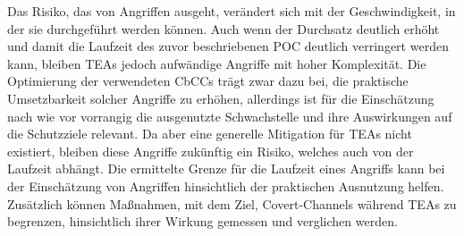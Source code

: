 Das Risiko, das von Angriffen ausgeht, verändert sich mit der
Geschwindigkeit, in der sie durchgeführt werden können. Auch
wenn der Durchsatz deutlich erhöht und damit die Laufzeit des
zuvor beschriebenen \ac{POC} deutlich verringert werden kann,
bleiben \acp{TEA} jedoch aufwändige Angriffe mit hoher Komplexität.
Die Optimierung der verwendeten \acp{CbCC} trägt zwar dazu bei,
die praktische Umsetzbarkeit solcher Angriffe zu erhöhen,
allerdings ist für die Einschätzung nach wie vor vorrangig
die ausgenutzte Schwachstelle und ihre Auswirkungen auf die
Schutzziele relevant. Da aber eine generelle Mitigation für
\acp{TEA} nicht existiert, bleiben diese Angriffe zukünftig
ein Risiko, welches auch von der Laufzeit abhängt. Die ermittelte
Grenze für die Laufzeit eines Angriffs kann bei der Einschätzung
von Angriffen hinsichtlich der praktischen Ausnutzung helfen.
Zusätzlich können Maßnahmen, mit dem Ziel, Covert-Channels während
\acp{TEA} zu begrenzen, hinsichtlich ihrer Wirkung gemessen und
verglichen werden.
